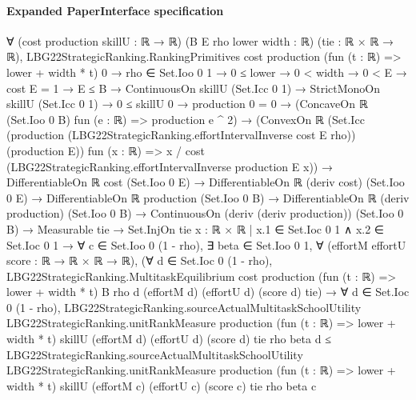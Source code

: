 \documentclass[10pt]{article}
\begin{document}
\paragraph{Expanded PaperInterface specification}
\begin{ReviewVerbatim}
∀ (cost production skillU : ℝ → ℝ) (B E rho lower width : ℝ) (tie : ℝ × ℝ → ℝ),
  LBG22StrategicRanking.RankingPrimitives cost production (fun (t : ℝ) => lower + width * t) 0 →
    rho ∈ Set.Ioo 0 1 →
      0 ≤ lower →
        0 < width →
          0 < E →
            cost E = 1 →
              E ≤ B →
                ContinuousOn skillU (Set.Icc 0 1) →
                  StrictMonoOn skillU (Set.Icc 0 1) →
                    0 ≤ skillU 0 →
                      production 0 = 0 →
                        (ConcaveOn ℝ (Set.Ioo 0 B) fun (e : ℝ) => production e ^ 2) →
                          (ConvexOn ℝ
                              (Set.Icc (production (LBG22StrategicRanking.effortIntervalInverse cost E rho))
                                (production E))
                              fun (x : ℝ) => x / cost (LBG22StrategicRanking.effortIntervalInverse production E x)) →
                            DifferentiableOn ℝ cost (Set.Ioo 0 E) →
                              DifferentiableOn ℝ (deriv cost) (Set.Ioo 0 E) →
                                DifferentiableOn ℝ production (Set.Ioo 0 B) →
                                  DifferentiableOn ℝ (deriv production) (Set.Ioo 0 B) →
                                    ContinuousOn (deriv (deriv production)) (Set.Ioo 0 B) →
                                      Measurable tie →
                                        Set.InjOn tie {x : ℝ × ℝ | x.1 ∈ Set.Ioc 0 1 ∧ x.2 ∈ Set.Ioc 0 1} →
                                          ∀ c ∈ Set.Ioo 0 (1 - rho),
                                            ∃ beta ∈ Set.Ioo 0 1,
                                              ∀ (effortM effortU score : ℝ → ℝ × ℝ → ℝ),
                                                (∀ d ∈ Set.Ioc 0 (1 - rho),
                                                    LBG22StrategicRanking.MultitaskEquilibrium cost production
                                                      (fun (t : ℝ) => lower + width * t) B rho d (effortM d) (effortU d)
                                                      (score d) tie) →
                                                  ∀ d ∈ Set.Ioc 0 (1 - rho),
                                                    LBG22StrategicRanking.sourceActualMultitaskSchoolUtility
                                                        LBG22StrategicRanking.unitRankMeasure production
                                                        (fun (t : ℝ) => lower + width * t) skillU (effortM d)
                                                        (effortU d) (score d) tie rho beta d ≤
                                                      LBG22StrategicRanking.sourceActualMultitaskSchoolUtility
                                                        LBG22StrategicRanking.unitRankMeasure production
                                                        (fun (t : ℝ) => lower + width * t) skillU (effortM c)
                                                        (effortU c) (score c) tie rho beta c
\end{ReviewVerbatim}
\end{document}
